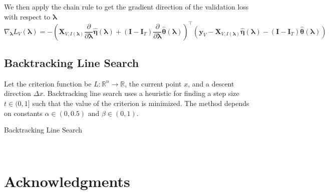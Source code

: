 \documentclass[10pt,letterpaper]{article}
\begin{document}
We then apply the chain rule to get the gradient direction of the validation loss with respect to $\boldsymbol \lambda$
\begin{equation}
\nabla_{\boldsymbol{\lambda}} L_V(\boldsymbol{\lambda}) =
- \left(
\boldsymbol{X}_{V, I(\boldsymbol\lambda)} \frac{\partial}{\partial \boldsymbol{\lambda}}\hat{\boldsymbol\eta}(\boldsymbol{\lambda})
+ (\boldsymbol I - \boldsymbol{I}_T) \frac{\partial}{\partial \boldsymbol{\lambda}}\hat{\boldsymbol\theta}(\boldsymbol{\lambda})
\right )^\top
\left (
\boldsymbol{y}_V
- \boldsymbol{X}_{V, I(\boldsymbol\lambda)} \hat{\boldsymbol\eta}(\boldsymbol{\lambda})
- (\boldsymbol I - \boldsymbol{I}_T) \hat{\boldsymbol\theta}(\boldsymbol{\lambda})
\right )
\end{equation}


\subsection{Backtracking Line Search}

Let the criterion function be $L:\mathbb{R}^n \rightarrow \mathbb{R}$, the current point $x$, and a descent direction $\Delta x$. Backtracking line search uses a heuristic for finding a step size $t \in (0,1]$ such that the value of the criterion is minimized. The method depends on constants $\alpha  \in (0, 0.5)$ and $\beta \in (0,1)$.

\begin{algorithm}
\caption{Backtracking Line Search}
\label{alg:backtracking}
         \begin{algorithmic}
  	 \\
	\ENDWHILE
	\end{algorithmic}
\end{algorithm}


\section*{Acknowledgments}




\end{document}
